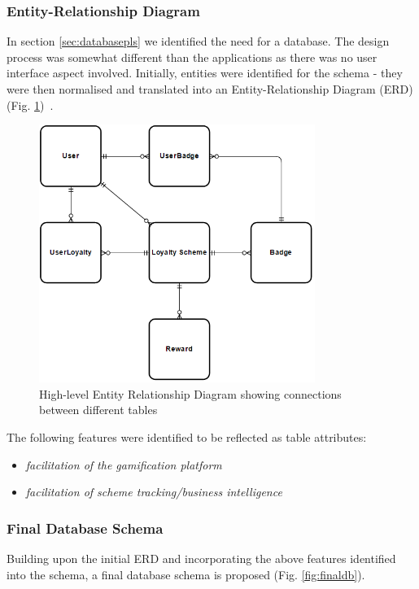 \subsubsection{Entity-Relationship Diagram}
In section \ref{sec:databasepls} we identified the need for a database.
The design process was somewhat different than the applications as there was no user interface aspect involved. Initially, entities were identified for the schema - they were then normalised and translated into an Entity-Relationship Diagram (ERD)(Fig. \ref{fig:erd})~\cite{erd}.

\begin{figure}[H]
  \centering
    \includegraphics[width=0.8\textwidth]{img/erd.png}
      \caption{High-level Entity Relationship Diagram showing connections between different tables}
      \label{fig:erd}
\end{figure}

The following features were identified to be reflected as table attributes:
\begin{itemize}
  \item \textit{facilitation of the gamification platform}
  \item \textit{facilitation of scheme tracking/business intelligence}
\end{itemize}

\newpage
\subsubsection{Final Database Schema}
Building upon the initial ERD and incorporating the above features identified into the schema, a final database schema is proposed  (Fig. \ref{fig:finaldb}). 


